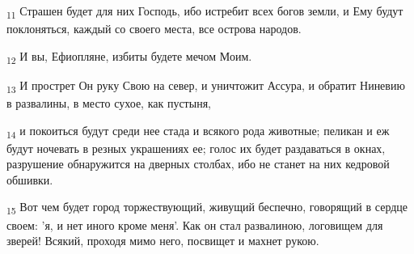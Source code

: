 \begin{tcolorbox}
\textsubscript{11} Страшен будет для них Господь, ибо истребит всех богов земли, и Ему будут поклоняться, каждый со своего места, все острова народов.
\end{tcolorbox}
\begin{tcolorbox}
\textsubscript{12} И вы, Ефиопляне, избиты будете мечом Моим.
\end{tcolorbox}
\begin{tcolorbox}
\textsubscript{13} И прострет Он руку Свою на север, и уничтожит Ассура, и обратит Ниневию в развалины, в место сухое, как пустыня,
\end{tcolorbox}
\begin{tcolorbox}
\textsubscript{14} и покоиться будут среди нее стада и всякого рода животные; пеликан и еж будут ночевать в резных украшениях ее; голос их будет раздаваться в окнах, разрушение обнаружится на дверных столбах, ибо не станет на них кедровой обшивки.
\end{tcolorbox}
\begin{tcolorbox}
\textsubscript{15} Вот чем будет город торжествующий, живущий беспечно, говорящий в сердце своем: 'я, и нет иного кроме меня'. Как он стал развалиною, логовищем для зверей! Всякий, проходя мимо него, посвищет и махнет рукою.
\end{tcolorbox}
